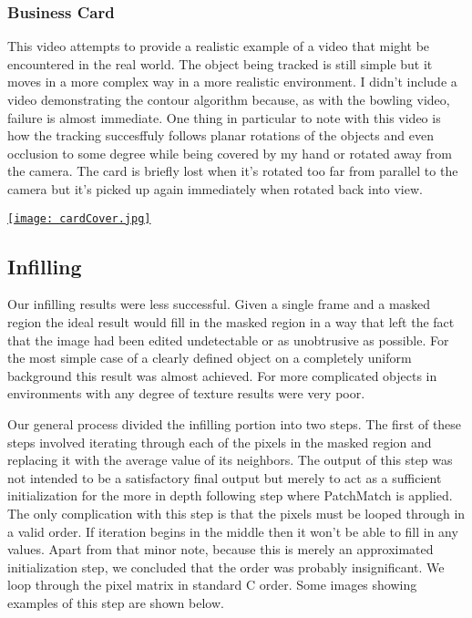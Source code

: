 \documentclass[12pt]{article}
\begin{document}
\subsubsection{Business Card}
This video attempts to provide a realistic example of a video that might be encountered in the real world. The object being tracked is still simple but it moves in a more complex way in a more realistic environment. I didn't include a video demonstrating the contour algorithm because, as with the bowling video, failure is almost immediate. One thing in particular to note with this video is how the tracking succesffuly follows planar rotations of the objects and even occlusion to some degree while being covered by my hand or rotated away from the camera. The card is briefly lost when it's rotated too far from parallel to the camera but it's picked up again immediately when rotated back into view.

\href{https://www.youtube.com/watch?v=DBMAxPnzEjU&feature=youtu.be}{\texttt{[image: cardCover.jpg]}}

\subsection{Infilling}
Our infilling results were less successful. Given a single frame and a masked region the ideal result would fill in the masked region in a way that left the fact that the image had been edited undetectable or as unobtrusive as possible. For the most simple case of a clearly defined object on a completely uniform background this result was almost achieved. For more complicated objects in environments with any degree of texture results were very poor.

Our general process divided the infilling portion into two steps. The first of these steps involved iterating through each of the pixels in the masked region and replacing it with the average value of its neighbors. The output of this step was not intended to be a satisfactory final output but merely to act as a sufficient initialization for the more in depth following step where PatchMatch is applied. The only complication with this step is that the pixels must be looped through in a valid order. If iteration begins in the middle then it won't be able to fill in any values. Apart from that minor note, because this is merely an approximated initialization step, we concluded that the order was probably insignificant. We loop through the pixel matrix in standard C order. Some images showing examples of this step are shown below. 
\end{document}
